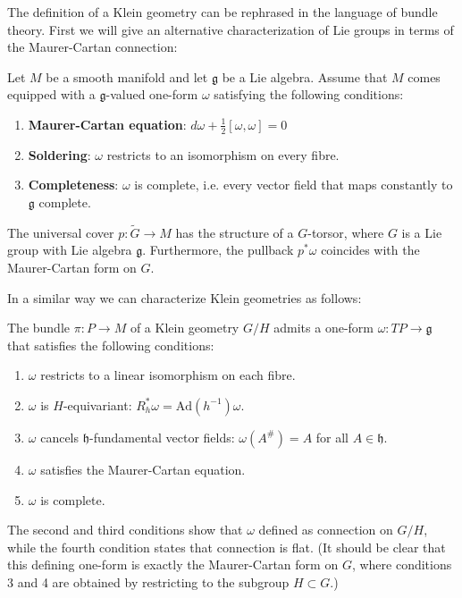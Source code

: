     The definition of a Klein geometry can be rephrased in the language of bundle theory. First we will give an alternative characterization of Lie groups in terms of the Maurer-Cartan connection:
    \begin{property}
        Let $M$ be a smooth manifold and let $\mathfrak{g}$ be a Lie algebra. Assume that $M$ comes equipped with a $\mathfrak{g}$-valued one-form $\omega$ satisfying the following conditions:
        \begin{enumerate}
            \item \textbf{Maurer-Cartan equation}: $d\omega + \frac{1}{2}[\omega,\omega]=0$
            \item \textbf{Soldering}: $\omega$ restricts to an isomorphism on every fibre.
            \item \textbf{Completeness}: $\omega$ is complete, i.e. every vector field that maps constantly to $\mathfrak{g}$ complete.
        \end{enumerate}
        The universal cover $p:\widetilde{G}\rightarrow M$ has the structure of a $G$-torsor, where $G$ is a Lie group with Lie algebra $\mathfrak{g}$. Furthermore, the pullback $p^*\omega$ coincides with the Maurer-Cartan form on $G$.
    \end{property}

    In a similar way we can characterize Klein geometries as follows:
    \begin{property}
        The bundle $\pi:P\rightarrow M$ of a Klein geometry $G/H$ admits a one-form $\omega:TP\rightarrow\mathfrak{g}$ that satisfies the following conditions:
        \begin{enumerate}
            \item $\omega$ restricts to a linear isomorphism on each fibre.
            \item $\omega$ is $H$-equivariant: $R_h^*\omega = \text{Ad}(h^{-1})\omega$.
            \item $\omega$ cancels $\mathfrak{h}$-fundamental vector fields: $\omega(A^\#)=A$ for all $A\in\mathfrak{h}$.
            \item $\omega$ satisfies the Maurer-Cartan equation.
            \item $\omega$ is complete.
        \end{enumerate}
    \end{property}
    The second and third conditions show that $\omega$ defined as connection on $G/H$, while the fourth condition states that connection is flat. (It should be clear that this defining one-form is exactly the Maurer-Cartan form on $G$, where conditions 3 and 4 are obtained by restricting to the subgroup $H\subset G$.)

